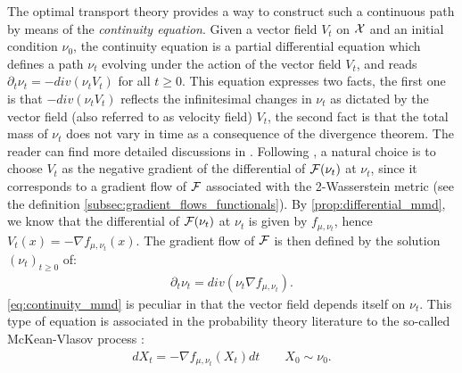 The optimal transport theory provides a way to construct such a continuous path by means of the \textit{continuity equation}. Given a vector field $V_t$ on ${{\mathcal X}}$ and an initial condition $\nu_0$, the continuity equation is a partial differential equation which defines a path $\nu_t$ evolving under the action of the vector field $V_t$, and reads $\partial_t \nu_t = -div(\nu_t V_t)$ for all $t\geq0$.
This equation expresses two facts, the first one is that $-div(\nu_t V_t)$ reflects the infinitesimal changes in $\nu_t$ as dictated by the vector field (also referred to as velocity field) $V_t$, the second fact is that the total mass of $\nu_t$ does not vary in time as a consequence of the divergence theorem. The reader can find more detailed discussions in \cite{Santambrogio:2015}. Following  \cite{ambrosio2008gradient}, a natural choice is to choose $V_t$ as the negative gradient of the differential of ${{\mathcal F}}(\nu_t)$ at $\nu_t$, since it corresponds to a gradient flow of ${{\mathcal F}}$ associated with the 2-Wasserstein metric (see the definition \cref{subsec:gradient_flows_functionals}). %
By \cref{prop:differential_mmd}, we know that the differential of ${{\mathcal F}}(\nu_t)$  at $\nu_t$ is given by $f_{\mu,\nu_t}$, hence $V_t(x) = -\nabla f_{\mu,\nu_t}(x)$. The
gradient flow of ${{\mathcal F}}$ is then defined by the solution $(\nu_t)_{t\geq 0}$ of:
\begin{align}\label{eq:continuity_mmd}
	\partial_t \nu_t = div(\nu_t \nabla f_{\mu,\nu_t}).
\end{align}
\cref{eq:continuity_mmd} is peculiar in that the vector field depends itself on $\nu_t$.   This type of equation is associated in the probability theory literature to the so-called McKean-Vlasov process \cite{kac1956foundations,mckean1966class}:
\begin{align}\label{eq:mcKean_Vlasov_process}
	d X_t = -\nabla f_{\mu,\nu_t}(X_t)dt \qquad X_0\sim \nu_0.
\end{align}

